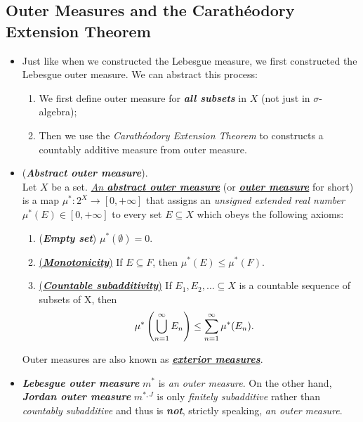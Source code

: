 \documentclass[11pt]{article}
\begin{document}
\subsection{Outer Measures and the Carath{\'e}odory Extension Theorem}
\begin{itemize}
\item \begin{remark}
Just like when we constructed the Lebesgue measure, we first constructed the Lebesgue outer measure. We can abstract this process: 
\begin{enumerate}
\item We first define outer measure for \emph{\textbf{all subsets}} in $X$ (not just in $\sigma$-algebra);
\item Then we use the \emph{Carath{\'e}odory Extension Theorem} to constructs a countably additive measure from outer measure.
\end{enumerate}
\end{remark}

\item \begin{definition} (\emph{\textbf{Abstract outer measure}}). \citep{tao2011introduction} \\
Let $X$ be a set. \underline{\emph{An \textbf{abstract outer measure}}} (or \underline{\emph{\textbf{outer measure}}} for short) is a map $\mu^{*}: 2^X \rightarrow [0, +\infty]$ that assigns an \emph{unsigned extended real number} $\mu^{*}(E) \in [0, +\infty]$ to every set $E \subseteq X$ which obeys the following axioms:
\begin{enumerate}
\item (\textbf{\emph{Empty set}}) $\mu^{*}(\emptyset) = 0$.
\item \underline{(\textbf{\emph{Monotonicity}})} If $E \subseteq F$,  then $\mu^{*}(E) \le  \mu^{*}(F)$.
\item  \underline{(\textbf{\emph{Countable subadditivity}})} If $E_1, E_2, \ldots \subseteq X$ is a countable sequence of subsets of X, then 
\begin{align*}
\mu^{*}\left(\bigcup_{n=1}^{\infty} E_n\right) &\le \sum_{n=1}^{\infty}\mu^{*}(E_n).
\end{align*}
\end{enumerate}
Outer measures are also known as \underline{\emph{\textbf{exterior measures}}}.
\end{definition}

\item \begin{remark}
\emph{\textbf{Lebesgue outer measure}} $m^{*}$ is \emph{an outer measure}. On the other hand, \emph{\textbf{Jordan outer measure}} $m^{*, J}$ is only \emph{finitely subadditive} rather than \emph{countably subadditive} and thus is \emph{\textbf{not}}, strictly speaking, \emph{an outer measure}.
\end{remark}


\end{itemize}
\end{document}
